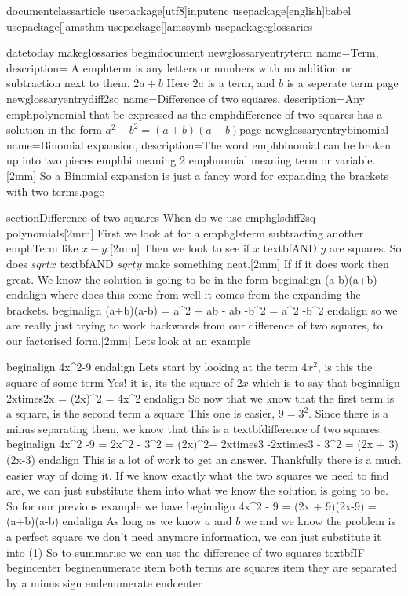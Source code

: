 

documentclass{article}
usepackage[utf8]{inputenc}
usepackage[english]{babel}
usepackage[]{amsthm} %
usepackage[]{amssymb} %
usepackage{glossaries}

datetoday
makeglossaries
begin{document}
newglossaryentry{term}{
name=Term,
description={
A emph{term} is any letters or numbers with no addition or subtraction next to them.
$2a + b$ Here $2a$ is a term, and $b$ is a seperate term
}page
}
newglossaryentry{diff2sq}
{name=Difference of two squares,
description={Any emph{polynomial} that be expressed as the emph{difference of two squares} has a solution in the form  $a^2 - b^2 =(a+b)(a-b)$}page}
newglossaryentry{binomial}{
name=Binomial expansion,
description={The word emph{binomial} can be broken up into two pieces emph{bi} meaning 2   emph{nomial} meaning term or variable.[2mm] So a Binomial expansion is just a fancy word for expanding the brackets with two terms.}page
}


section{Difference of two squares}
When do we use emph{gls{diff2sq}} polynomials[2mm]
First we look at for a emph{gls{term}} subtracting another emph{Term} like $x - y$.[2mm]
Then we look to see if $x$ textbf{AND} $y$ are squares. So does $sqrt{x}$ textbf{AND}  $sqrt{y}$ make something neat.[2mm] If if it does work then great. We know the solution is going to be in the form begin{align}
   (a-b)(a+b)
end{align}
where does this come from well it comes from the expanding the brackets.
begin{align}
       (a+b)(a-b) = a^2 + ab - ab -b^2 = a^2 -b^2
end{align}
so we are really just trying to work backwards  from our difference of two squares, to our factorised form.[2mm]
Lets look at an example

begin{align}
    4x^2-9
end{align}
Lets start by looking at the term $4x^2$, is this the square of some term
Yes! it is, its the square of $2x$ which is to say that begin{align}
    2xtimes2x = (2x)^2 = 4x^2
end{align}
 So now that we know that the first term is a square, is the second term a square 
This one is easier, $9 = 3^2$. Since there is a minus separating them, we know that this is a textbf{difference of two squares}.
begin{align}
    4x^2 -9 = 2x^2 - 3^2 = (2x)^2+ 2xtimes3 -2xtimes3 - 3^2 = (2x + 3) (2x-3)
end{align}
This is a lot of work to get an answer. Thankfully there is a much easier way of doing it. If we know exactly what the two squares we need to find are, we can just substitute them into what we know the solution is going to be. So for our previous example we have
begin{align}
    4x^2 - 9 = (2x + 9)(2x-9) = (a+b)(a-b)
end{align}
As long as we know $a$ and $b$ we and we know the problem is a perfect square we don't need anymore information, we can just substitute it into (1)
So to summarise we can use the difference of two squares textbf{IF}
begin{center}
    begin{enumerate}
    item both terms are squares
    item they are separated by a minus sign
end{enumerate}
end{center}

